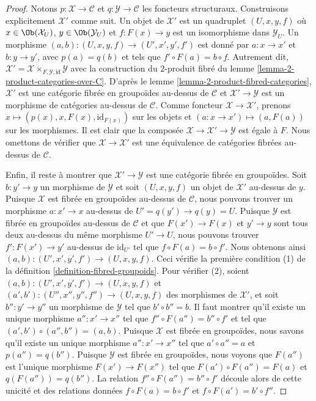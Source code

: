 \begin{proof}
Notons $p : \mathcal{X} \to \mathcal{C}$ et $q : \mathcal{Y} \to \mathcal{C}$
les foncteurs structuraux. Construisons explicitement $\mathcal{X}'$ comme suit.
Un objet de $\mathcal{X}'$ est un quadruplet $(U, x, y, f)$ où
$x \in \Ob(\mathcal{X}_U)$, $y \in \Ob(\mathcal{Y}_U)$
et $f : F(x) \to y$ est un isomorphisme dans $\mathcal{Y}_U$.
Un morphisme $(a, b) : (U, x, y, f) \to (U', x', y', f')$ est donné
par $a : x \to x'$ et $b : y \to y'$, avec $p(a) = q(b)$ et
tels que $f' \circ F(a) = b \circ f$. Autrement dit,
$\mathcal{X}' = \mathcal{X} \times_{F, \mathcal{Y}, \text{id}} \mathcal{Y}$
avec la construction du $2$-produit fibré du
lemme \ref{lemma-2-product-categories-over-C}.
D'après le
lemme \ref{lemma-2-product-fibred-categories},
$\mathcal{X}'$ est une catégorie fibrée en groupoïdes au-dessus de
$\mathcal{C}$ et $\mathcal{X}' \to \mathcal{Y}$ est un morphisme de
catégories au-dessus de $\mathcal{C}$. Comme foncteur $\mathcal{X} \to \mathcal{X}'$, prenons
$x \mapsto (p(x), x, F(x), \text{id}_{F(x)})$ sur les objets et
$(a : x \to x') \mapsto (a, F(a))$ sur les morphismes. Il est clair que
la composée $\mathcal{X} \to \mathcal{X}' \to \mathcal{Y}$
est égale à $F$. Nous omettons de vérifier que
$\mathcal{X} \to \mathcal{X}'$ est une équivalence de catégories fibrées au-dessus de
$\mathcal{C}$.

\medskip\noindent
Enfin, il reste à montrer que $\mathcal{X}' \to \mathcal{Y}$ est une catégorie
fibrée en groupoïdes. Soit $b : y' \to y$ un morphisme de $\mathcal{Y}$
et soit $(U, x, y, f)$ un objet de $\mathcal{X}'$ au-dessus de $y$.
Puisque $\mathcal{X}$ est fibrée en groupoïdes au-dessus de $\mathcal{C}$, nous
pouvons trouver un morphisme $a : x' \to x$ au-dessus de $U' = q(y') \to q(y) = U$.
Puisque $\mathcal{Y}$ est fibrée en groupoïdes au-dessus de $\mathcal{C}$ et que
$F(x') \to F(x)$ et $y' \to y$ sont tous deux au-dessus du même morphisme $U' \to U$,
nous pouvons trouver $f' : F(x') \to y'$ au-dessus de $\text{id}_{U'}$ tel que
$f \circ F(a) = b \circ f'$. Nous obtenons ainsi
$(a, b) : (U', x', y', f') \to (U, x, y, f)$.
Ceci vérifie la première condition (1) de la
définition \ref{definition-fibred-groupoids}.
Pour vérifier (2), soient
$(a, b) : (U', x', y', f') \to (U, x, y, f)$ et
$(a', b') : (U'', x'', y'', f'') \to (U, x, y, f)$ des morphismes de
$\mathcal{X}'$, et soit $b'' : y' \to y''$ un morphisme de $\mathcal{Y}$
tel que $b' \circ b'' = b$. Il faut montrer qu'il existe
un unique morphisme $a'' : x' \to x''$ tel que
$f'' \circ F(a'') = b'' \circ f'$ et tel que
$(a', b') \circ (a'', b'') = (a, b)$. Puisque $\mathcal{X}$ est fibrée
en groupoïdes, nous savons qu'il existe un unique morphisme
$a'' : x' \to x''$ tel que $a' \circ a'' = a$ et $p(a'') = q(b'')$.
Puisque $\mathcal{Y}$ est fibrée en groupoïdes, nous voyons que
$F(a'')$ est l'unique morphisme $F(x') \to F(x'')$ tel que
$F(a') \circ F(a'') = F(a)$ et $q(F(a'')) = q(b'')$. La relation
$f'' \circ F(a'') = b'' \circ f'$ découle alors de cette unicité et des relations données
$f \circ F(a) = b \circ f'$ et $f \circ F(a') = b' \circ f''$.
\end{proof}

